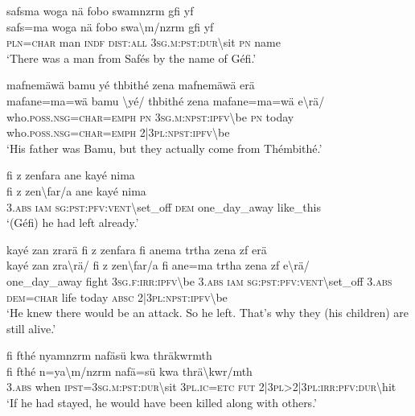 \ea\label{ex:4:a1715}
safsma woga nä fobo swamnzrm gfi yf\\
\gll safs=ma	woga	nä	fobo	swa{\textbackslash}m/nzrm	gfi	yf\\
     \textsc{pln}=\textsc{char}	man	\textsc{indf}	\textsc{dist}:\textsc{all}	3\textsc{sg}.\textsc{m}:\textsc{pst}:\textsc{dur}{\textbackslash}sit	\textsc{pn}	name\\
\glt `There was a man from Safés by the name of Géfi.'
\z

\ea\label{ex:4:a1716}
mafnemäwä bamu yé thbithé zena mafnemäwä erä\\
\gll mafane=ma=wä	bamu	{\textbackslash}yé/	thbithé	zena	mafane=ma=wä	e{\textbackslash}rä/\\
     who.\textsc{poss}.\textsc{nsg}=\textsc{char}=\textsc{emph}	\textsc{pn}	3\textsc{sg}.\textsc{m}:\textsc{npst}:\textsc{ipfv}{\textbackslash}be	\textsc{pn}	today	who.\textsc{poss}.\textsc{nsg}=\textsc{char}=\textsc{emph}	2|3\textsc{pl}:\textsc{npst}:\textsc{ipfv}{\textbackslash}be\\
\glt `His father was Bamu, but they actually come from Thémbithé.'
\z

\ea\label{ex:4:a1717}
fi z zenfara ane kayé nima\\
\gll fi	z	zen{\textbackslash}far/a	ane	kayé	nima\\
     3.\textsc{abs}	\textsc{iam}	\textsc{sg}:\textsc{pst}:\textsc{pfv}:\textsc{vent}{\textbackslash}set\_off	\textsc{dem}	one\_day\_away	like\_this\\
\glt `(Géfi) he had left already.'
\z

\ea\label{ex:4:a1718}
kayé zan zrarä fi z zenfara fi anema trtha zena zf erä\\
\gll kayé	zan	zra{\textbackslash}rä/	fi	z	zen{\textbackslash}far/a	fi	ane=ma	trtha	zena	zf	e{\textbackslash}rä/\\
     one\_day\_away	fight	3\textsc{sg}.\textsc{f}:\textsc{irr}:\textsc{ipfv}{\textbackslash}be	3.\textsc{abs}	\textsc{iam}	\textsc{sg}:\textsc{pst}:\textsc{pfv}:\textsc{vent}{\textbackslash}set\_off	3.\textsc{abs}	\textsc{dem}=\textsc{char}	life	today	\textsc{absc}	2|3\textsc{pl}:\textsc{npst}:\textsc{ipfv}{\textbackslash}be\\
\glt `He knew there would be an attack. So he left. That's why they (his children) are still alive.'
\z

\newpage
\ea\label{ex:4:a1719}
fi fthé nyamnzrm nafäsü kwa thräkwrmth\\
\gll fi	fthé	n=ya{\textbackslash}m/nzrm	nafä=sü	kwa	thrä{\textbackslash}kwr/mth\\
     3.\textsc{abs}	when	\textsc{ipst}=3\textsc{sg}.\textsc{m}:\textsc{pst}:\textsc{dur}{\textbackslash}sit	3\textsc{pl}.\textsc{ic}=\textsc{etc}	\textsc{fut}	2|3\textsc{pl}>2|3\textsc{pl}:\textsc{irr}:\textsc{pfv}:\textsc{dur}{\textbackslash}hit\\
\glt `If he had stayed, he would have been killed along with others.'
\z

